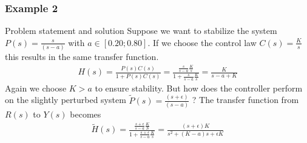 \begin{frame}
	\frametitle{Example 2}
	\begin{exampleblock}{Problem statement and solution}
		Suppose we want to stabilize the system $P(s)=\frac{s}{(s - a)}$ with $a\in[0.20;0.80]$. If we choose the control law $C(s)=\frac{K}{s}$ this results in the same transfer function.
		\vspace{-0.5em}
		\begin{align*}
			H(s) = \frac{P(s)C(s)}{1+P(s)C(s)} = \frac{\frac{s}{s-a}\frac{K}{s}}{1+\frac{s}{s-a} \frac{K}{s}} = \frac{K}{s-a+K}
		\end{align*}
		Again we choose $K>a$ to ensure stability.
		But how does the controller perform on the slightly perturbed system $\tilde{P}(s)=\frac{(s+\epsilon)}{(s - a)}$  ?
		The transfer function from $R(s)$ to $Y(s)$ becomes
				\vspace{-0.5em}
		\begin{align*}
			\tilde{H}(s) = \frac{\frac{s+\epsilon}{s-a} \frac{K}{S}}{1+\frac{s+\epsilon}{s-a}\frac{K}{s}}
			= \frac{(s+\epsilon)K}{s^2 + (K-a)s + \epsilon K}
		\end{align*}
	\end{exampleblock}
\end{frame}

